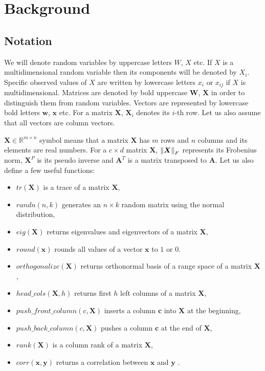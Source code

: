 
\chapter{Background}
\section{Notation}

We will denote random variables by uppercase letters $W$, $X$ etc. If $X$ is a multidimensional random variable then its components will be denoted by $X_i$. Specific observed values of $X$ are written by lowercase letters $x_i$ or $x_{ij}$ if $X$ is multidimensional. Matrices are denoted by bold uppercase $\boldsymbol{W}$, $\boldsymbol{X}$ in order to distinguish them from random variables. Vectors are represented by lowercase bold letters $\boldsymbol{w}$, $\boldsymbol{x}$ etc. For a matrix $\boldsymbol{X}$, $\boldsymbol{X}_{i}$ denotes its $i$-th row. Let us also assume that all vectors are column vectors. 

$\boldsymbol{X} \in \mathbb{R}^{m \times n}$ symbol means that a matrix $\boldsymbol{X}$ has $m$ rows and $n$ columns and its elements are real numbers. For a $c \times d$  matrix $\boldsymbol{X}$, $\left\lVert\boldsymbol{X}\right\rVert_{F}$ represents its Frobenius norm, $\boldsymbol{X}^P$ is its pseudo inverse and $\boldsymbol{A}^T$ is a matrix transposed to $\boldsymbol{A}$. 
Let us also define a few useful functions:
\begin{itemize}
\item $tr(\boldsymbol{X})$ is a trace of a matrix $\boldsymbol{X}$, 
\item $randn(n,k)$ generates an $n \times k$ random matrix using the normal distribution,
\item $eig(\boldsymbol{X})$ returns eigenvalues and eigenvectors of a matrix $\boldsymbol{X}$,
\item $round(\boldsymbol{x})$ rounds all values of a vector $\boldsymbol{x}$ to $1$ or $0$.
\item $orthogonalize(\boldsymbol{X})$ returns orthonormal basis of a range space of a matrix $\boldsymbol{X}$,
\item $head\_cols(\boldsymbol{X},h)$ returns first $h$ left columns of a matrix $\boldsymbol{X}$,
\item $push\_front\_column(c,\boldsymbol{X})$ inserts a column $\boldsymbol{c}$ into $\boldsymbol{X}$ at the beginning,
\item $push\_back\_column(c,\boldsymbol{X})$ pushes a column $\boldsymbol{c}$ at the end of $\boldsymbol{X}$,
\item $rank(\boldsymbol{X})$ is a column rank of a matrix $\boldsymbol{X}$,
\item $corr(\boldsymbol{x},\boldsymbol{y})$ returns a correlation between $\boldsymbol{x}$ and $\boldsymbol{y}$ . 

\end{itemize}

